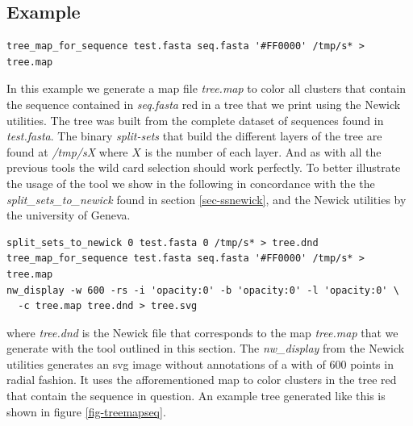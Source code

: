 \subsection{Example}
\begin{lstlisting}
tree_map_for_sequence test.fasta seq.fasta '#FF0000' /tmp/s* > tree.map
\end{lstlisting}
In this example we generate a map file \emph{tree.map} to color all
clusters that contain the sequence contained in \emph{seq.fasta} red in a
tree that we print using the Newick utilities. The tree was built from
the complete dataset of sequences found in \emph{test.fasta}. The
binary \emph{split-sets} that build the different layers of the tree
are found at \emph{/tmp/sX} where $X$ is the number of each layer. And
as with all the previous tools the wild card selection should work
perfectly. To better illustrate the usage of the tool we show in the
following in concordance with the the \emph{split\_sets\_to\_newick}
found in section \ref{sec-ssnewick}, and the Newick utilities
\cite{newick_tools} by the university of Geneva.
\begin{lstlisting}
split_sets_to_newick 0 test.fasta 0 /tmp/s* > tree.dnd
tree_map_for_sequence test.fasta seq.fasta '#FF0000' /tmp/s* > tree.map
nw_display -w 600 -rs -i 'opacity:0' -b 'opacity:0' -l 'opacity:0' \
  -c tree.map tree.dnd > tree.svg
\end{lstlisting}
where \emph{tree.dnd} is the Newick file that corresponds to the map
\emph{tree.map} that we generate with the tool outlined in this
section. The \emph{nw\_display} from the Newick utilities
\cite{newick_tools} generates an svg image without annotations of a
with of 600 points in radial fashion. It uses the afforementioned map
to color clusters in the tree red that contain the sequence in
question. An example tree generated like this is shown in figure
\ref{fig-treemapseq}.

